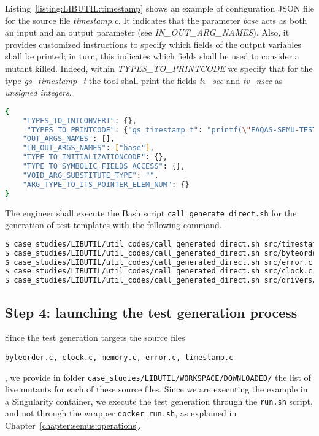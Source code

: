 Listing~\ref{listing:LIBUTIL:timestamp} shows an example of configuration JSON file for the source file \emph{timestamp.c}. It indicates that the parameter \emph{base} acts as both an input and an output parameter (see \emph{IN\_OUT\_ARG\_NAMES}). Also, it provides customized instructions to specify which fields of the output variables shall be printed; in turn, this indicates which fields shall be used to consider a mutant killed. Indeed, within \emph{TYPES\_TO\_PRINTCODE} we specify that for the type \emph{gs\_timestamp\_t} the tool shall print the fields \emph{tv\_sec} and \emph{tv\_nsec} as \emph{unsigned integers}.

\begin{lstlisting}[language=bash,label=listing:LIBUTIL:timestamp,caption=JSON configuration file for timestamp.c.]
{
    "TYPES_TO_INTCONVERT": {},
     "TYPES_TO_PRINTCODE": {"gs_timestamp_t": "printf(\"FAQAS-SEMU-TEST-OUTPUT: result_faqas_semu = tv_sec: %u, tv_nsec: %u\\n\", {}.tv_sec, {}.tv_nsec);"},
    "OUT_ARGS_NAMES": [],
    "IN_OUT_ARGS_NAMES": ["base"],
    "TYPE_TO_INITIALIZATIONCODE": {},
    "TYPE_TO_SYMBOLIC_FIELDS_ACCESS": {},
    "VOID_ARG_SUBSTITUTE_TYPE": "",
    "ARG_TYPE_TO_ITS_POINTER_ELEM_NUM": {}
}
\end{lstlisting}

The engineer shall execute the Bash script \texttt{call\_generate\_direct.sh} for the generation of test templates with the following command.

\begin{lstlisting}[language=bash]
$ case_studies/LIBUTIL/util_codes/call_generated_direct.sh src/timestamp.c
$ case_studies/LIBUTIL/util_codes/call_generated_direct.sh src/byteorder.c
$ case_studies/LIBUTIL/util_codes/call_generated_direct.sh src/error.c
$ case_studies/LIBUTIL/util_codes/call_generated_direct.sh src/clock.c
$ case_studies/LIBUTIL/util_codes/call_generated_direct.sh src/drivers/sys/memory.c
\end{lstlisting}

\subsection{Step 4: launching the test generation process}

Since the test generation targets the source files \begin{small}\texttt{byteorder.c, clock.c, memory.c, error.c, timestamp.c}\end{small}, we provide in folder \texttt{case\_studies/LIBUTIL/WORKSPACE/DOWNLOADED/} the list of live mutants for each of these source files. 
Since we are executing the example in a Singularity container, we execute the test generation through the \texttt{run.sh} script, and not through the wrapper \texttt{docker\_run.sh}, as explained in Chapter~\ref{chapter:semus:operations}.

